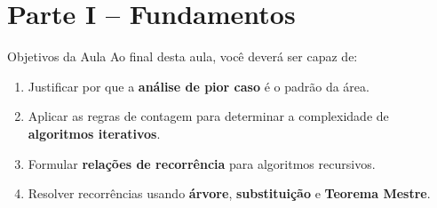 \documentclass[aspectratio=169]{beamer}
\begin{document}
\section{Parte I -- Fundamentos}

\begin{frame}{Objetivos da Aula}
    Ao final desta aula, você deverá ser capaz de:
    \begin{enumerate}
        \item Justificar por que a \textbf{análise de pior caso} é o padrão da área.
        \item Aplicar as regras de contagem para determinar a complexidade de \textbf{algoritmos iterativos}.
        \item Formular \textbf{relações de recorrência} para algoritmos recursivos.
        \item Resolver recorrências usando \textbf{árvore}, \textbf{substituição} e \textbf{Teorema Mestre}.
    \end{enumerate}
\end{frame}
\end{document}
